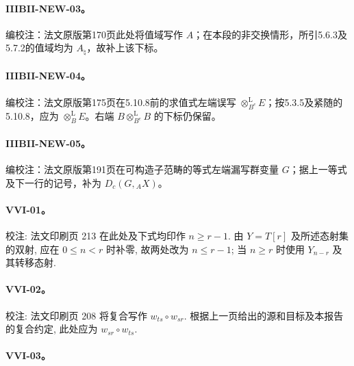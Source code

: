 \hypertarget{collation-IIIBII-NEW-03}{}

\paragraph*{IIIBII-NEW-03。}

编校注：法文原版第170页此处将值域写作 $A$；在本段的非交换情形，所引5.6.3及5.7.2的值域均为 $A_\natural$，故补上该下标。

\hypertarget{collation-IIIBII-NEW-04}{}

\paragraph*{IIIBII-NEW-04。}

编校注：法文原版第175页在5.10.8前的求值式左端误写 $\otimes^{\mathrm L}_{B^e}E$；按5.3.5及紧随的5.10.8，应为 $\otimes^{\mathrm L}_BE$。右端 $B\otimes^{\mathrm L}_{B^e}B$ 的下标仍保留。

\hypertarget{collation-IIIBII-NEW-05}{}

\paragraph*{IIIBII-NEW-05。}

编校注：法文原版第191页在可构造子范畴的等式左端漏写群变量 $G$；据上一等式及下一行的记号，补为 $D_c(G,{}_AX)$。

\hypertarget{collation-VVI-01}{}

\paragraph*{VVI-01。}

校注: 法文印刷页 213 在此处及下式均印作 $n\ge r-1$. 由 $Y=T[r]$ 及所述态射集的双射, 应在 $0\le n<r$ 时补零, 故两处改为 $n\le r-1$; 当 $n\ge r$ 时使用 $Y_{n-r}$ 及其转移态射.

\hypertarget{collation-VVI-02}{}

\paragraph*{VVI-02。}

校注: 法文印刷页 208 将复合写作 $w_{ts}\circ w_{sr}$. 根据上一页给出的源和目标及本报告的复合约定, 此处应为 $w_{sr}\circ w_{ts}$.

\hypertarget{collation-VVI-03}{}

\paragraph*{VVI-03。}

